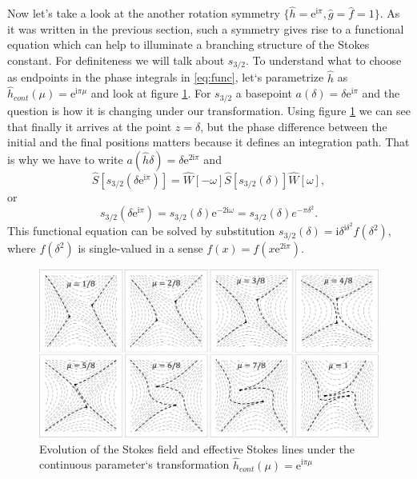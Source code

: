 \documentclass[atmp]{ipart_v1}
\def\rme{\mathrm{e}}
\def\rmi{\mathrm{i}}
\def\S{\widehat{S}}
\def\W{\widehat{W}}
\def\f{\hat{f}}
\def\g{\hat{g}}
\def\h{\hat{h}}
\def\unity{1}
\def\w{\omega}
\newcommand\eref[1]{\eqref{#1}}
\newcommand\fref[1]{figure \ref{#1}}
\begin{document}
Now let's take a look at the another rotation symmetry $\{\h=\rme^{\rmi\pi},\g=\f=\unity\}$. 
As it was written in the previous section, such a symmetry gives rise to a functional 
equation which can help to illuminate a branching structure of the Stokes constant. 
For definiteness we will talk about $s_{3/2}$. To understand what to choose as endpoints 
in the phase integrals in \eref{eq:func}, let`s parametrize $\h$ as $\h_{cont}(\mu)=\rme^{\rmi\pi\mu}$ 
and look at \fref{fig:webrs}. For $s_{3/2}$ a basepoint $a(\delta)=\delta \rme^{\rmi\pi}$ 
and the question is how it is changing under our transformation. Using \fref{fig:webrs} 
we can see that finally it arrives at the point $z=\delta$, but the phase difference between the
initial and the final positions matters because it defines an integration path.
That is why we have to write $a(\h\delta)=\delta \rme^{2\rmi\pi}$ and
\begin{equation}
\S \left[ s_{3/2}(\delta \rme^{\rmi\pi}) \right] = 
\W \left[- \w \right]
\S \left[ s_{3/2} (\delta) \right]
\W \left[  \w \right],
\end{equation}
or
\begin{equation}
s_{3/2}(\delta \rme^{\rmi\pi})=s_{3/2}(\delta)\rme^{-2\rmi \w}=s_{3/2}(\delta)e^{-\pi\delta^2}.
\label{eq:websym_2}
\end{equation}
This functional equation can be solved by substitution 
$s_{3/2}(\delta)=\rmi\delta^{\rmi\delta^2}f(\delta^2)$, where $f(\delta^2)$
is single-valued in a sense $f(x)=f(x \rme^{2\rmi\pi})$.

\begin{figure}
\centering
\noindent
\includegraphics[width=\textwidth]{stuff/wrs.png}
\caption{Evolution of the Stokes field and effective Stokes lines 
under the continuous parameter`s transformation $\h_{cont}(\mu)=\rme^{\rmi\pi\mu}$}
\label{fig:webrs}
\end{figure} 
\end{document}
